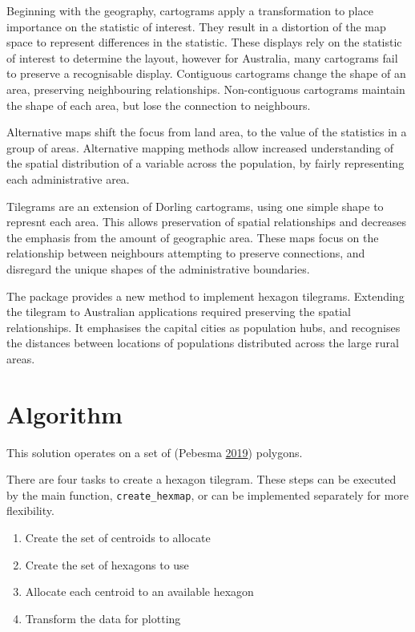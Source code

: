 Beginning with the geography, cartograms apply a transformation to place
importance on the statistic of interest. They result in a distortion of
the map space to represent differences in the statistic. These displays
rely on the statistic of interest to determine the layout, however for
Australia, many cartograms fail to preserve a recognisable display.
Contiguous cartograms change the shape of an area, preserving
neighbouring relationships. Non-contiguous cartograms maintain the shape
of each area, but lose the connection to neighbours.

Alternative maps shift the focus from land area, to the value of the
statistics in a group of areas. Alternative mapping methods allow
increased understanding of the spatial distribution of a variable across
the population, by fairly representing each administrative area.

Tilegrams are an extension of Dorling cartograms, using one simple shape
to represnt each area. This allows preservation of spatial relationships
and decreases the emphasis from the amount of geographic area. These
maps focus on the relationship between neighbours attempting to preserve
connections, and disregard the unique shapes of the administrative
boundaries.

The  package provides a new method to implement
hexagon tilegrams. Extending the tilegram to Australian applications
required preserving the spatial relationships. It emphasises the capital
cities as population hubs, and recognises the distances between
locations of populations distributed across the large rural areas.

\hypertarget{algorithm}{%
\section{Algorithm}\label{algorithm}}

This solution operates on a set of  (Pebesma
\protect\hyperlink{ref-sf}{2019}) polygons.

There are four tasks to create a hexagon tilegram. These steps can be
executed by the main function, \texttt{create\_hexmap}, or can be
implemented separately for more flexibility.

\begin{enumerate}
\def\labelenumi{\arabic{enumi}.}
\tightlist
\item
  Create the set of centroids to allocate
\item
  Create the set of hexagons to use
\item
  Allocate each centroid to an available hexagon
\item
  Transform the data for plotting
\end{enumerate}

